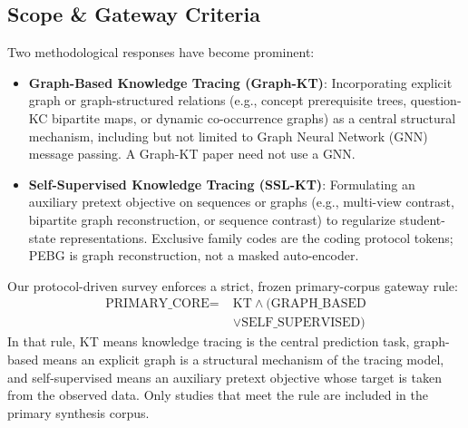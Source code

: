\documentclass[lettersize,journal]{IEEEtran}
\begin{document}
\subsection{Scope \& Gateway Criteria}
Two methodological responses have become prominent:
\begin{itemize}
    \item \textbf{Graph-Based Knowledge Tracing (Graph-KT)}: Incorporating explicit graph or graph-structured relations (e.g., concept prerequisite trees, question-KC bipartite maps, or dynamic co-occurrence graphs) as a central structural mechanism, including but not limited to Graph Neural Network (GNN) message passing. A Graph-KT paper need not use a GNN.
    \item \textbf{Self-Supervised Knowledge Tracing (SSL-KT)}: Formulating an auxiliary pretext objective on sequences or graphs (e.g., multi-view contrast, bipartite graph reconstruction, or sequence contrast) to regularize student-state representations. Exclusive family codes are the coding protocol tokens; PEBG is graph reconstruction, not a masked auto-encoder.
\end{itemize}
Our protocol-driven survey enforces a strict, frozen primary-corpus gateway rule:
\begin{equation}
\begin{split}
\text{PRIMARY\_CORE} = \; & \text{KT} \land (\text{GRAPH\_BASED} \\
& \lor \text{SELF\_SUPERVISED})
\end{split}
\end{equation}
In that rule, KT means knowledge tracing is the central prediction task, graph-based means an explicit graph is a structural mechanism of the tracing model, and self-supervised means an auxiliary pretext objective whose target is taken from the observed data. Only studies that meet the rule are included in the primary synthesis corpus.
\end{document}
